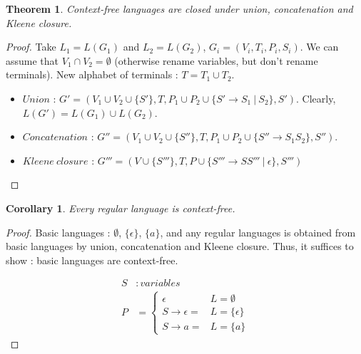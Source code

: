 \documentclass[a4paper,11pt]{article}
\newtheorem{thm}{Theorem}[section]
\newtheorem{cor}{Corollary}[section]
\begin{document}
\begin{thm}
  Context-free languages are closed under union, concatenation and Kleene closure.
\end{thm}

\begin{proof}
  Take $L_1 = L(G_1)$ and $L_2 = L(G_2)$, $G_i = (V_i,T_i,P_i,S_i)$. We can
  assume that $V_1 \cap V_2 = \emptyset$ (otherwise rename variables, but don't
  rename terminals). New alphabet of terminals : $T = T_1 \cup T_2$.

  \begin{itemize}
  \item $Union$ : $G' = (V_1 \cup V_2 \cup \{S'\}, T, P_1 \cup P_2 \cup \{S' \to
    S_1\ |\ S_2\},S')$. Clearly, $L(G') = L(G_1) \cup L(G_2)$.
  \item $Concatenation$ : $G'' = (V_1 \cup V_2 \cup \{S''\}, T, P_1 \cup P_2
    \cup \{S'' \to S_1S_2\},S'')$.
  \item $Kleene\ closure$ : $G''' = (V \cup \{S'''\}, T, P \cup \{S''' \to SS'''
    \ |\ \epsilon\},S''')$
  \end{itemize}
\end{proof}

\begin{cor}
  Every regular language is context-free.
\end{cor}

\begin{proof}
  Basic languages : $\emptyset$, $\{\epsilon\}$, $\{a\}$, and any regular
  languages is obtained from basic languages by union, concatenation and Kleene
  closure. Thus, it suffices to show : basic languages are context-free.

  \begin{align*}
    S &: variables \\
    P &= \begin{cases}
      \epsilon & L = \emptyset \\
      S \to \epsilon = & L = \{ \epsilon \} \\
      S \to a = & L = \{a\}
    \end{cases}
  \end{align*}
\end{proof}
\end{document}
